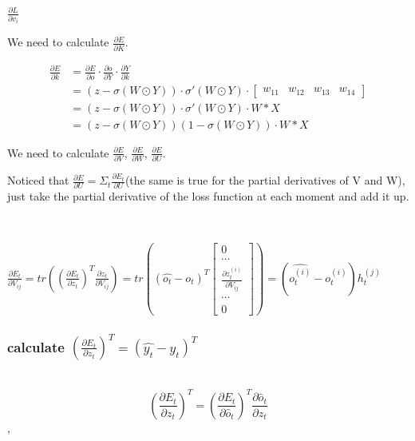 \documentclass[oneside,solution]{seu-ml-assign}
\begin{document}
\subproblem{}
$\frac{\partial L}{\partial v_i}$










We need to calculate $\frac{\partial E}{\partial K}$.

\begin{equation}
  \begin{aligned}
  \frac{\partial E}{\partial k} &= \frac{\partial E}{\partial o} \cdot \frac{\partial o}{\partial Y} \cdot \frac{\partial Y}{\partial k} \\
  &= \left( z - \sigma(W \odot Y) \right) \cdot \sigma'(W \odot Y) \cdot \begin{bmatrix} w_{11} & w_{12} & w_{13} & w_{14} \end{bmatrix} \\
  &= \left( z - \sigma(W \odot Y) \right) \cdot \sigma'(W \odot Y) \cdot W \ast X \\
  &= \left( z - \sigma(W \odot Y) \right) (1 - \sigma(W \odot Y)) \cdot W \ast X
  \end{aligned}
  \end{equation}
  





We need to calculate $\frac{\partial E }{ \partial V }$, $\frac{\partial E }{ \partial W }$, $\frac{\partial E }{ \partial U }$.

Noticed that $\frac{\partial E}{\partial U}=\Sigma_t\frac{\partial E_t}{\partial U}$(the same is true for the partial derivatives of V and W),
just take the partial derivative of the loss function at each moment and add it up.

\

$\frac{\partial E_t}{\partial V_{ij}}=tr((\frac{\partial E_t}{\partial z_t})^T\frac{\partial z_t}{\partial V_{ij}})=tr((\hat{o_t}-o_t)^T\begin{bmatrix}0\\\cdots\\\frac{\partial z_t^{(i)}}{\partial V_{ij}}\\\cdots\\0\end{bmatrix})=(\hat{o_t^{(i)}}-o_t^{(i)})h_t^{(j)}$


\subsubsection{calculate $(\frac{\partial E_{t}}{\partial z_{t}})^{T}=(\hat{y_{t}}-y_{t})^{T}$}
\
\[
  \left(\frac{\partial E_t}{\partial z_t}\right)^T = \left(\frac{\partial E_t}{\partial \hat{o}_t}\right)^T \frac{\partial \hat{o}_t}{\partial z_t}
\],
\end{document}
